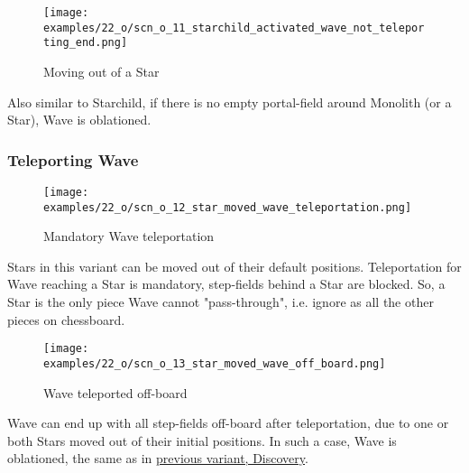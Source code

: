 \vspace*{5.1\baselineskip}
\noindent
\begin{wrapfigure}[5]{l}{0.4\textwidth}
\centering
\texttt{[image: examples/22\_o/scn\_o\_11\_starchild\_activated\_wave\_not\_teleporting\_end.png]}
\caption{Moving out of a Star}
\label{fig:scn_o_11_starchild_activated_wave_not_teleporting_end}
\end{wrapfigure}
Also similar to Starchild, if there is no empty portal-field around Monolith (or a Star), Wave
is oblationed.

\clearpage %

\subsubsection*{Teleporting Wave}

\vspace*{-0.9\baselineskip}
\noindent
\begin{figure}[!h]
\texttt{[image: examples/22\_o/scn\_o\_12\_star\_moved\_wave\_teleportation.png]}
\caption{Mandatory Wave teleportation}
\label{fig:scn_o_12_star_moved_wave_teleportation}
\end{figure}

Stars in this variant can be moved out of their default positions. Teleportation for Wave
reaching a Star is mandatory, step-fields behind a Star are blocked. So, a Star is the only
piece Wave cannot "pass-through", i.e. ignore as all the other pieces on chessboard.

\clearpage %

\vspace*{-2.1\baselineskip}
\noindent
\begin{figure}[!h]
\texttt{[image: examples/22\_o/scn\_o\_13\_star\_moved\_wave\_off\_board.png]}
\caption{Wave teleported off-board}
\label{fig:scn_o_13_star_moved_wave_off_board}
\end{figure}

Wave can end up with all step-fields off-board after teleportation, due to one or both Stars
moved out of their initial positions. In such a case, Wave is oblationed, the same as in
\hyperref[fig:scn_d_11_wave_teleported_off_board]{previous variant, Discovery}.

